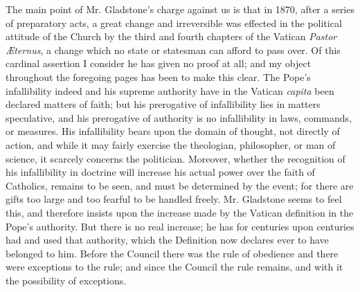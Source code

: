The main point of Mr. Gladstone's charge against us is that in 1870,
after a series of preparatory acts, a great change and irreversible was
effected in the political attitude of the Church by the third and fourth
chapters of the Vatican \emph{Pastor Æternus}, a change which no state
or statesman can afford to pass over. Of this cardinal assertion I
consider he has given no proof at all; and my object throughout the
foregoing pages has been to make this clear. The Pope's infallibility
indeed and his supreme authority have in the Vatican \emph{capita} been
declared matters of faith; but his prerogative of infallibility lies in
matters speculative, and his prerogative of authority is no
infallibility in laws, commands, or measures. His infallibility bears
upon the domain of thought, not directly of action, and while it may
fairly exercise the theologian, philosopher, or man of science, it
scarcely concerns the politician. Moreover, whether the recognition of
his infallibility in doctrine will increase his actual power over the
faith of Catholics, remains to be seen, and must be determined by the
event; for there are gifts too large and too fearful to be handled
freely. Mr. Gladstone seems to feel this, and therefore insists upon the
increase made by the Vatican definition in the Pope's authority. But
there is no real increase; he has for centuries upon centuries had and
used that authority, which the Definition now declares ever to have
belonged to him. Before the Council there was the rule of obedience and
there were exceptions to the rule; and since the Council the rule
remains, and with it the possibility of exceptions.


